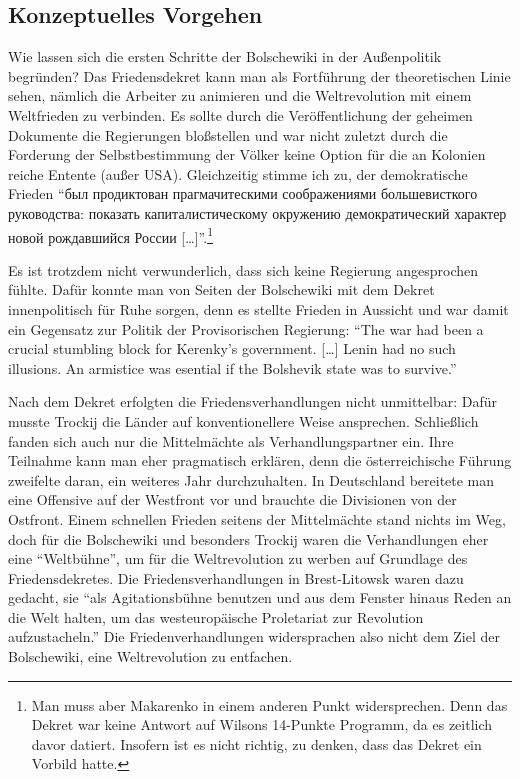 \documentclass[12pt,headsepline,a4paper]{scrartcl}
\newcommand\textcyr[1]{{\fontencoding{OT2}\fontfamily{wncyr}\selectfont #1}}
\begin{document}
\subsection{Konzeptuelles Vorgehen}
Wie lassen sich die ersten Schritte der Bolschewiki in der Außenpolitik begründen? Das Friedensdekret kann man als Fortführung der theoretischen Linie sehen, nämlich die Arbeiter zu animieren und die Weltrevolution mit einem Weltfrieden zu verbinden. Es sollte durch die Veröffentlichung der geheimen Dokumente die Regierungen bloßstellen und war nicht zuletzt durch die Forderung der Selbstbestimmung der Völker keine Option für die an Kolonien reiche Entente (außer USA). Gleichzeitig stimme ich zu, der demokratische Frieden "`\textcyr{был продиктован прагмачитескими соображениями большевисткого руководства: показать капиталистическому окружению демократический характер новой рождавшийся России [\ldots]}"'\autocite{maka2010}.\footnote{Man muss aber Makarenko in einem anderen Punkt widersprechen. Denn das Dekret war keine Antwort auf Wilsons 14-Punkte Programm, da es zeitlich davor datiert. Insofern ist es nicht richtig, zu denken, dass das Dekret ein Vorbild hatte.}

Es ist trotzdem nicht verwunderlich, dass sich keine Regierung angesprochen fühlte. Dafür konnte man von Seiten der Bolschewiki mit dem Dekret innenpolitisch für Ruhe sorgen, denn es stellte Frieden in Aussicht und war damit ein Gegensatz zur Politik der Provisorischen Regierung: "`The war had been a crucial stumbling block for Kerenky's government. [\ldots] Lenin had no such illusions. An armistice was esential if the Bolshevik state was to survive."'\autocite[39]{marples2011}

Nach dem Dekret erfolgten die Friedensverhandlungen nicht unmittelbar: Dafür musste Trockij die Länder auf konventionellere Weise ansprechen. Schließlich fanden sich auch nur die Mittelmächte als Verhandlungspartner ein. Ihre Teilnahme kann man eher pragmatisch erklären, denn die österreichische Führung zweifelte daran, ein weiteres Jahr durchzuhalten. In Deutschland bereitete man eine Offensive auf der Westfront vor und brauchte die Divisionen von der Ostfront. Einem schnellen Frieden seitens der Mittelmächte stand nichts im Weg, doch für die Bolschewiki und besonders Trockij waren die Verhandlungen eher eine "`Weltbühne"', um für die Weltrevolution zu werben auf Grundlage des Friedensdekretes. Die Friedensverhandlungen in Brest-Litowsk waren dazu gedacht, sie "`als Agitationsbühne benutzen und aus dem Fenster hinaus Reden an die Welt halten, um das westeuropäische Proletariat zur Revolution aufzustacheln."'\autocite[21]{baum1966}
Die Friedenverhandlungen widersprachen also nicht dem Ziel der Bolschewiki, eine Weltrevolution zu entfachen. 
\end{document}
